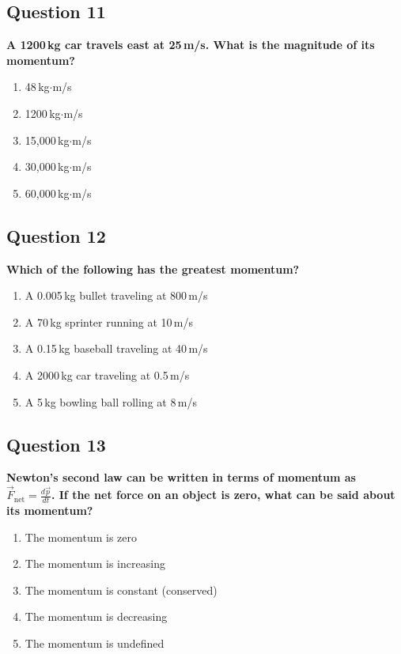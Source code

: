 \documentclass[12pt,letterpaper]{article}
\begin{document}
\subsection{Question 11}

\begin{questionbox}
\textbf{A 1200\,kg car travels east at 25\,m/s. What is the magnitude of its momentum?}

\begin{enumerate}[label=\alph*)]
    \item 48\,kg$\cdot$m/s
    \item 1200\,kg$\cdot$m/s
    \item 15{,}000\,kg$\cdot$m/s
    \item 30{,}000\,kg$\cdot$m/s
    \item 60{,}000\,kg$\cdot$m/s
\end{enumerate}
\end{questionbox}

\subsection{Question 12}

\begin{questionbox}
\textbf{Which of the following has the greatest momentum?}

\begin{enumerate}[label=\alph*)]
    \item A 0.005\,kg bullet traveling at 800\,m/s
    \item A 70\,kg sprinter running at 10\,m/s
    \item A 0.15\,kg baseball traveling at 40\,m/s
    \item A 2000\,kg car traveling at 0.5\,m/s
    \item A 5\,kg bowling ball rolling at 8\,m/s
\end{enumerate}
\end{questionbox}

\subsection{Question 13}

\begin{questionbox}
\textbf{Newton's second law can be written in terms of momentum as $\vec{F}_{\text{net}} = \frac{d\vec{p}}{dt}$. If the net force on an object is zero, what can be said about its momentum?}

\begin{enumerate}[label=\alph*)]
    \item The momentum is zero
    \item The momentum is increasing
    \item The momentum is constant (conserved)
    \item The momentum is decreasing
    \item The momentum is undefined
\end{enumerate}
\end{questionbox}
\end{document}
